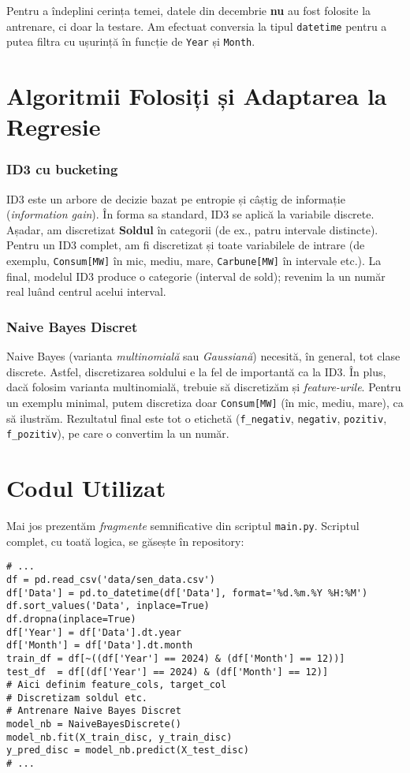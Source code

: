 \documentclass[12pt,a4paper]{article}
\begin{document}
Pentru a îndeplini cerința temei, datele din decembrie \textbf{nu} au fost folosite la antrenare, ci doar la testare. Am efectuat conversia la tipul \texttt{datetime} pentru a putea filtra cu ușurință în funcție de \texttt{Year} și \texttt{Month}.

\section*{Algoritmii Folosiți și Adaptarea la Regresie}

\subsubsection*{ID3 cu bucketing}
ID3 este un arbore de decizie bazat pe entropie și câștig de informație (\emph{information gain}). În forma sa standard, ID3 se aplică la variabile discrete. Așadar, am discretizat \textbf{Soldul} în categorii (de ex., patru intervale distincte). Pentru un ID3 complet, am fi discretizat și toate variabilele de intrare (de exemplu, \texttt{Consum[MW]} în mic, mediu, mare, \texttt{Carbune[MW]} în intervale etc.). 
La final, modelul ID3 produce o categorie (interval de sold); 
revenim la un număr real luând centrul acelui interval.

\subsubsection*{Naive Bayes Discret}
Naive Bayes (varianta \emph{multinomială} sau \emph{Gaussiană}) necesită, în general, tot clase discrete. Astfel, discretizarea soldului e la fel de importantă ca la ID3. În plus, dacă folosim varianta multinomială, trebuie să discretizăm și \emph{feature-urile}. Pentru un exemplu minimal, putem discretiza doar \texttt{Consum[MW]} (în mic, mediu, mare), ca să ilustrăm. Rezultatul final este tot o etichetă (\texttt{f\_negativ}, \texttt{negativ}, \texttt{pozitiv}, \texttt{f\_pozitiv}), pe care o convertim la un număr.

\section*{Codul Utilizat}

Mai jos prezentăm \emph{fragmente} semnificative din scriptul \texttt{main.py}. Scriptul complet, cu toată logica, se găsește în repository:

\begin{verbatim}
# ...
df = pd.read_csv('data/sen_data.csv')
df['Data'] = pd.to_datetime(df['Data'], format='%d.%m.%Y %H:%M')
df.sort_values('Data', inplace=True)
df.dropna(inplace=True)
df['Year'] = df['Data'].dt.year
df['Month'] = df['Data'].dt.month
train_df = df[~((df['Year'] == 2024) & (df['Month'] == 12))]
test_df  = df[(df['Year'] == 2024) & (df['Month'] == 12)]
# Aici definim feature_cols, target_col
# Discretizam soldul etc.
# Antrenare Naive Bayes Discret
model_nb = NaiveBayesDiscrete()
model_nb.fit(X_train_disc, y_train_disc)
y_pred_disc = model_nb.predict(X_test_disc)
# ...
\end{verbatim}
\end{document}
